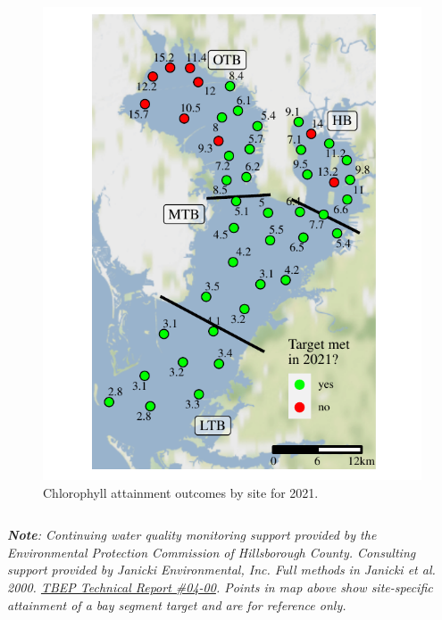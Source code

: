 \documentclass[final,t]{beamer}\usepackage[]{graphicx}\usepackage[]{color}
\begin{document}
\begin{frame}
\begin{columns}[t]
\begin{column}{.79\linewidth}
\begin{columns}[t]
\begin{column}{0.37\textwidth}
\begin{figure}
\centerline{\includegraphics[trim = 0cm 0cm 0cm -1.25cm, width=1.1\linewidth]{figure/sitemap.pdf}}
\caption{\footnotesize Chlorophyll attainment outcomes by site for 2021.}
\label{fig:sitemap}
\end{figure}

\end{column}

\end{columns}

\vspace{-0.4cm}

\tiny \textit{\textbf{Note}: Continuing water quality monitoring support provided by the Environmental Protection Commission of Hillsborough County.  Consulting support provided by Janicki Environmental, Inc.  Full methods in Janicki et al. 2000. \href{https://drive.google.com/file/d/1XMULU8w4syWcSv_ciOUOhnC_G4xt6GIF/view?usp=drivesdk}{TBEP Technical Report \#04-00}. Points in map above show site-specific attainment of a bay segment target and are for reference only.} \\

\end{column}

\end{columns}

\end{frame}
\end{document}
